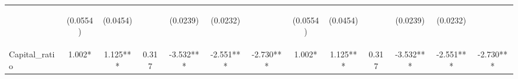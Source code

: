 \documentclass[]{article}
\begin{document}
\begin{center}
\begin{tabular}{lcccccccccccc}
\vspace{4pt} & \begin{footnotesize}(0.0554)\end{footnotesize} & \begin{footnotesize}(0.0454)\end{footnotesize} & \begin{footnotesize}\end{footnotesize} & \begin{footnotesize}(0.0239)\end{footnotesize} & \begin{footnotesize}(0.0232)\end{footnotesize} & \begin{footnotesize}\end{footnotesize} & \begin{footnotesize}(0.0554)\end{footnotesize} & \begin{footnotesize}(0.0454)\end{footnotesize} & \begin{footnotesize}\end{footnotesize} & \begin{footnotesize}(0.0239)\end{footnotesize} & \begin{footnotesize}(0.0232)\end{footnotesize} & \begin{footnotesize}\end{footnotesize} \\
Capital\_ratio & 1.002* & 1.125*** & 0.317 & -3.532*** & -2.551*** & -2.730*** & 1.002* & 1.125*** & 0.317 & -3.532*** & -2.551*** & -2.730*** \\

\end{tabular}
\end{center}
\end{document}
